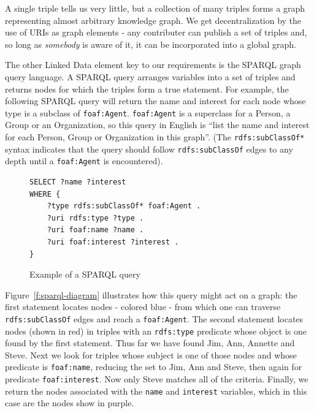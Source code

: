 A single triple tells us very little, but a collection of many triples 
forms a graph representing almost arbitrary knowledge graph. We get 
decentralization by the use of URIs as graph elements - any contributer 
can publish a set of triples and, so long as \emph{somebody} is aware of 
it, it can be incorporated into a global graph.

The other Linked Data element key to our requirements is the SPARQL 
graph query language. A SPARQL query 
arranges variables into a set of triples and returns nodes for which
the triples form a true statement. For example, the following SPARQL query
will return the name and interest for each node whose type is 
a subclass of \texttt{foaf:Agent}. \texttt{foaf:Agent} is a superclass for a Person, a 
Group or an Organization, so this query in English is ``list the name and 
interest for each Person, Group or Organization in this graph''. (The 
\texttt{rdfs:subClassOf*} syntax indicates that the query should follow 
\texttt{rdfs:subClassOf} edges to any depth until a \texttt{foaf:Agent} 
is encountered).

\begin{figure}[H]
\begin{verbatim}
SELECT ?name ?interest 
WHERE {    
    ?type rdfs:subClassOf* foaf:Agent .
    ?uri rdfs:type ?type .
    ?uri foaf:name ?name .
    ?uri foaf:interest ?interest .
}
\end{verbatim}
\caption{Example of a SPARQL query}
\label{f:sparql}
\end{figure}

Figure~\ref{f:sparql-diagram} illustrates how this query might act on a graph: 
the first statement locates nodes - colored blue - from which one can traverse \texttt{rdfs:subClassOf} edges and reach a \texttt{foaf:Agent}. The second statement 
locates nodes (shown in red) in triples with an \texttt{rdfs:type} predicate whose object 
is one found by the first statement. Thus far we have found Jim, 
Ann, Annette and Steve. Next we look for triples whose subject is one of those nodes
and whose predicate is \texttt{foaf:name}, reducing the set to Jim, Ann and Steve, then
again for predicate \texttt{foaf:interest}. Now only Steve matches all of the criteria.
Finally, we return the nodes associated with the \texttt{name} and \texttt{interest} 
variables, which in this case are the nodes show in purple.

